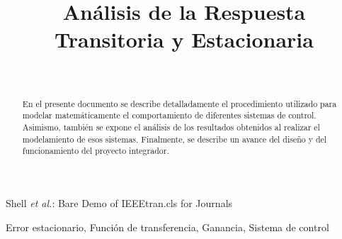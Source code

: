 \documentclass[journal]{IEEEtran}
\begin{document}
\title{An\'alisis de la Respuesta Transitoria y Estacionaria}

\author{
  \\
}


%
{Shell \MakeLowercase{\textit{et al.}}: Bare Demo of IEEEtran.cls 
for Journals}
	
\maketitle
	
\begin{abstract}
En el presente documento se describe detalladamente el
procedimiento utilizado para modelar matem\'aticamente el
comportamiento de diferentes sistemas de control.
Asimismo, tambi\'en se expone el an\'alisis de los resultados
obtenidos al realizar el modelamiento de esos sistemas.
Finalmente, se describe un avance del 
dise\~no y del funcionamiento del proyecto integrador.   
\end{abstract}


\begin{IEEEkeywords}  
Error estacionario, Funci\'on de transferencia, 
Ganancia, Sistema de control  
\end{IEEEkeywords}


\IEEEpeerreviewmaketitle


\end{document}

